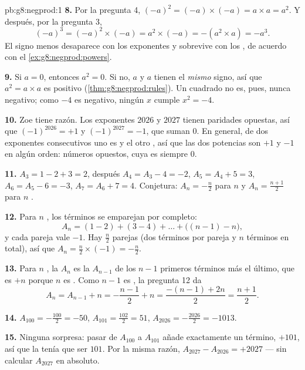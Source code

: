 \begin{solution}{pb:g8:negprod:1}
\textbf{8.} Por la pregunta 4, $(-a)^2 = (-a) \times (-a) = a \times a =
a^2$. Y después, por la pregunta 3,
\[
(-a)^3 = (-a)^2 \times (-a) = a^2 \times (-a) = -(a^2 \times a)
= -a^3 .
\]
El signo menos desaparece con los exponentes  y sobrevive con los ,
de acuerdo con el \cref{ex:g8:negprod:powers}.

\textbf{9.} Si $a = 0$, entonces $a^2 = 0$. Si no, $a$ y $a$ tienen
el \emph{mismo} signo, así que $a^2 = a \times a$ es positivo
(\cref{thm:g8:negprod:rules}). Un cuadrado no es, pues, nunca
negativo; como $-4$ es negativo, ningún  $x$ cumple
$x^2 = -4$.

\textbf{10.} Zoe tiene razón. Los exponentes $2026$ y $2027$ tienen
paridades opuestas, así que $(-1)^{2026} = +1$ y $(-1)^{2027} = -1$,
que suman $0$. En general, de dos exponentes consecutivos uno es
 y el otro , así que las dos potencias son $+1$ y $-1$ en algún
orden: números opuestos, cuya  es siempre $0$.

\textbf{11.} $A_3 = 1 - 2 + 3 = 2$, después
$A_4 = A_3 - 4 = -2$, $A_5 = A_4 + 5 = 3$, $A_6 = A_5 - 6 = -3$,
$A_7 = A_6 + 7 = 4$. Conjetura: $A_n = -\frac{n}{2}$ para $n$ 
y $A_n = \frac{n+1}{2}$ para $n$ .

\textbf{12.} Para $n$ , los términos se emparejan por completo:
\[
A_n = (1 - 2) + (3 - 4) + \dots + \bigl((n-1) - n\bigr),
\]
y cada pareja vale $-1$. Hay $\frac{n}{2}$ parejas (dos términos
por pareja y $n$ términos en total), así que
$A_n = \frac{n}{2} \times (-1) = -\frac{n}{2}$.

\textbf{13.} Para $n$ , la  $A_n$ es la  $A_{n-1}$ de los
$n - 1$ primeros términos más el último, que es $+n$ porque $n$ es
. Como $n - 1$ es , la pregunta 12 da
\[
A_n = A_{n-1} + n = -\frac{n-1}{2} + n
= \frac{-(n-1) + 2n}{2} = \frac{n+1}{2} .
\]

\textbf{14.} $A_{100} = -\frac{100}{2} = -50$, \quad
$A_{101} = \frac{102}{2} = 51$, \quad
$A_{2026} = -\frac{2026}{2} = -1013$.

\textbf{15.} Ninguna sorpresa: pasar de $A_{100}$ a $A_{101}$ añade
exactamente un término, $+101$, así que la  tenía que ser $101$.
Por la misma razón, $A_{2027} - A_{2026} = +2027$ --- sin
calcular $A_{2027}$ en absoluto.
\end{solution}

